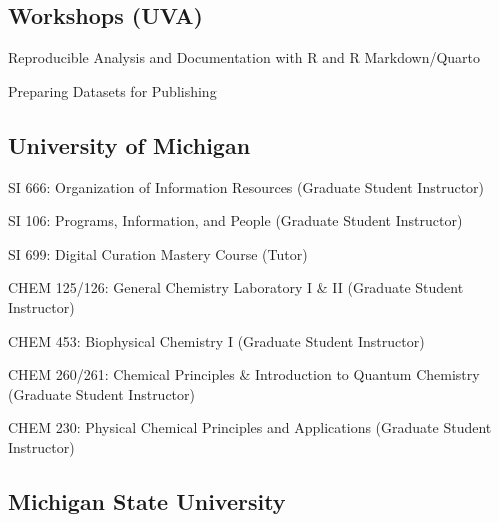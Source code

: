 \documentclass[12pt,letterpaper]{report}
\newcommand{\listitemspace}{0.25em}
\renewenvironment{itemize}
{\begin{list}{}{\setlength{\leftmargin}{0em}
            \setlength{\parskip}{0em}
            \setlength{\itemsep}{\listitemspace}
            \setlength{\parsep}{\listitemspace}}}
{\end{list}}
\begin{document}
\subsection*{Workshops (UVA)}

\begin{itemize}

	\item Reproducible Analysis and Documentation with R and R Markdown/Quarto

	\item Preparing Datasets for Publishing

\end{itemize}

\subsection*{University of Michigan}
    
\begin{itemize}
    	
    	\item SI 666: Organization of Information Resources (Graduate Student Instructor)
        
	\item SI 106: Programs, Information, and People (Graduate Student Instructor)
        
	\item SI 699: Digital Curation Mastery Course (Tutor)
        
	\item CHEM 125/126: General Chemistry Laboratory I \& II (Graduate Student Instructor)
        
	\item CHEM 453: Biophysical Chemistry I (Graduate Student Instructor)
        
	\item CHEM 260/261: Chemical Principles \& Introduction to Quantum Chemistry (Graduate Student Instructor)
        
	\item CHEM 230: Physical Chemical Principles and Applications (Graduate Student Instructor)
    
\end{itemize}
    	
\subsection*{Michigan State University}
\end{document}
